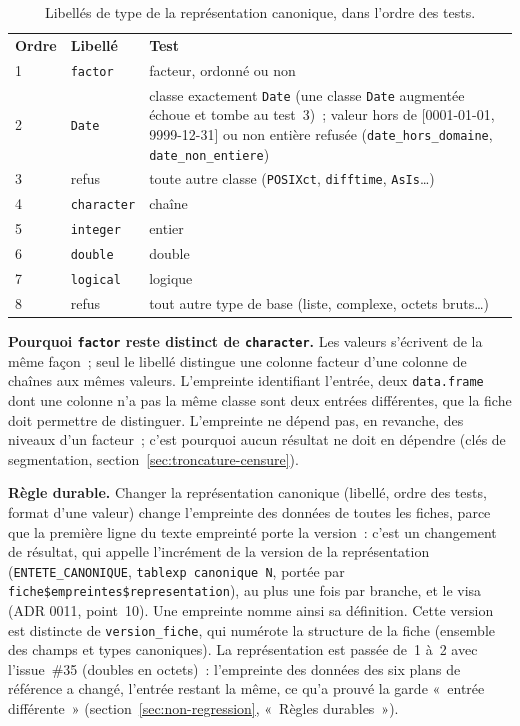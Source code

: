 \documentclass[a4paper,11pt]{article}
\newcommand{\code}[1]{\texttt{\small #1}}
\begin{document}
\begin{center}
\small
{}
\begin{longtable}{@{}p{1.2cm}p{2.4cm}p{11.0cm}@{}}
\caption{Libellés de type de la représentation canonique, dans l'ordre des
tests.}
\label{tab:types-canoniques}\\
\rowcolor{tableheader}
\textcolor{financeblue}{\textbf{Ordre}} &
\textcolor{financeblue}{\textbf{Libellé}} &
\textcolor{financeblue}{\textbf{Test}} \\
1 & \code{factor} & facteur, ordonné ou non \\
2 & \code{Date} & classe exactement \code{Date} (une classe \code{Date}
augmentée échoue et tombe au test~3)~; valeur hors de [0001-01-01,
9999-12-31] ou non entière refusée (\code{date\_hors\_domaine},
\code{date\_non\_entiere}) \\
3 & refus & toute autre classe (\code{POSIXct}, \code{difftime}, \code{AsIs}\ldots) \\
4 & \code{character} & chaîne \\
5 & \code{integer} & entier \\
6 & \code{double} & double \\
7 & \code{logical} & logique \\
8 & refus & tout autre type de base (liste, complexe, octets bruts\ldots) \\
\end{longtable}
\end{center}

\noindent
\textbf{Pourquoi \code{factor} reste distinct de \code{character}.} Les valeurs
s'écrivent de la même façon~; seul le libellé distingue une colonne facteur
d'une colonne de chaînes aux mêmes valeurs. L'empreinte identifiant l'entrée,
deux \code{data.frame} dont une colonne n'a pas la même classe sont deux
entrées différentes, que la fiche doit permettre de distinguer. L'empreinte ne
dépend pas, en revanche, des niveaux d'un facteur~; c'est pourquoi aucun
résultat ne doit en dépendre (clés de segmentation,
section~\ref{sec:troncature-censure}).

\medskip
\textbf{Règle durable.} Changer la représentation canonique (libellé, ordre
des tests, format d'une valeur) change l'empreinte des données de toutes les
fiches, parce que la première ligne du texte empreinté porte la version~:
c'est un changement de résultat, qui appelle l'incrément de la version de la
représentation (\code{ENTETE\_CANONIQUE}, \code{tablexp canonique N}, portée
par \code{fiche\$empreintes\$representation}), au plus une fois par branche,
et le visa (ADR 0011, point~10). Une empreinte nomme ainsi sa définition.
Cette version est distincte de \code{version\_fiche}, qui numérote la
structure de la fiche (ensemble des champs et types canoniques). La
représentation est passée de~1 à~2 avec l'issue~\#35 (doubles en octets)~:
l'empreinte des données des six plans de référence a changé, l'entrée
restant la même, ce qu'a prouvé la garde «~entrée différente~»
(section~\ref{sec:non-regression}, «~Règles durables~»).
\end{document}
